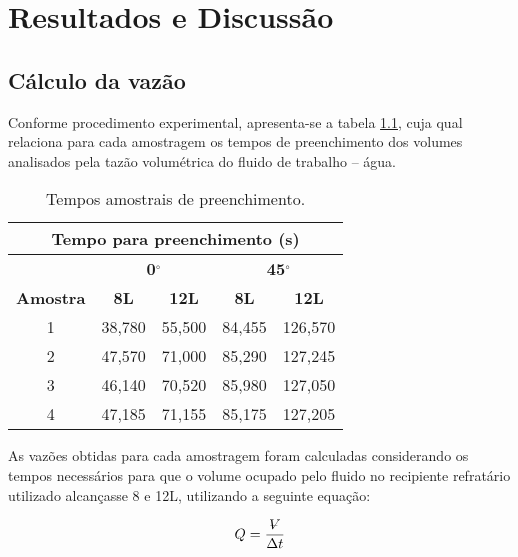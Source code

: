\chapter{Resultados e Discussão}
\label{chap:resultados}

\section{Cálculo da vazão}
\label{sec:vazao}

Conforme procedimento experimental, apresenta-se a tabela \ref{t:tempos}, cuja
qual relaciona para cada amostragem os tempos de preenchimento dos volumes
analisados pela tazão volumétrica do fluido de trabalho -- água.

\begin{table}[H]
\centering
\caption{Tempos amostrais de preenchimento.}
\label{t:tempos}
\begin{tabular}{|c|c|c|c|c|}
\hline
\multicolumn{5}{|c|}{\textbf{Tempo para preenchimento (s)}}                                      \\ \hline
\multicolumn{1}{|l|}{} & \multicolumn{2}{c|}{\textbf{0$^\circ$}}    & \multicolumn{2}{c|}{\textbf{45$^\circ$}}   \\ \hline
\textbf{Amostra}       & \textbf{8L} & \textbf{12L} & \textbf{8L} & \textbf{12L} \\ \hline
1                      & 38,780          & 55,500           & 84,455          & 126,570          \\ \hline
2                      & 47,570          & 71,000           & 85,290          & 127,245          \\ \hline
3                      & 46,140          & 70,520           & 85,980          & 127,050          \\ \hline
4                      & 47,185          & 71,155           & 85,175          & 127,205          \\ \hline
\end{tabular}
\end{table}

As vazões obtidas para cada amostragem foram calculadas considerando os tempos
necessários para que o volume ocupado pelo fluido no recipiente refratário
utilizado alcançasse 8 e 12L, utilizando a seguinte equação:

\newcommand{\Vol}{\mathop{\ooalign{\hfil$V$\hfil\cr\kern0.08em--\hfil\cr}}\nolimits}
\begin{equation}
  Q = \frac{\Vol}{\Delta t}
\end{equation}

